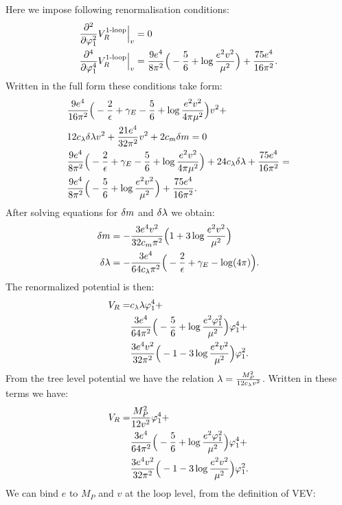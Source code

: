 Here we impose following renormalisation conditions:
\begin{align}
\frac{\partial^2 }{\partial \varphi_1^2}V_R^{\textrm{1-loop}}\Big|_{v} &= 0 \\
\frac{\partial^4 }{\partial \varphi_1^4}V_R^{\textrm{1-loop}}\Big|_{v} &= \frac{9e^4}{8\pi^2}\Big(-\frac{5}{6}+\log\frac{e^2
v^2}{\mu^2}\Big)
+\frac{75e^4}{16\pi^2}.
\end{align}
Written in the full form these conditions take form:
\begin{align}
&\frac{9e^4}{16\pi^2}\Big(-\frac{2}{\epsilon}+\gamma_E-\frac{5}{6}+\log\frac{e^2
v^2}{4\pi\mu^2}\Big)v^2+ \notag\\
& 12c_\lambda\delta\lambda v^2+\frac{21e^4}{32\pi^2}v^2+2c_m\delta m = 0 \\
&\frac{9e^4}{8\pi^2}\Big(-\frac{2}{\epsilon}+\gamma_E-\frac{5}{6}+\log\frac{e^2v^2}{4\pi\mu^2}\Big)+
24c_\lambda\delta\lambda+\frac{75e^4}{16\pi^2} = \notag \\
&\frac{9e^4}{8\pi^2}\Big(-\frac{5}{6}+\log\frac{e^2v^2}{\mu^2}\Big)+\frac{75e^4}{16\pi^2}.
\end{align}
After solving equations for $\delta m$ and $\delta\lambda$ we obtain:
\begin{align}
\delta m &= -\frac{3e^4v^2}{32c_m\pi^2}\Big(1+3
\log\frac{e^2v^2}{\mu^2}\Big) \\
\delta\lambda &= -\frac{3e^4}{64c_\lambda\pi^2}\Big(-\frac{2}{\epsilon}+\gamma_E-\log(4\pi)\Big).
\end{align}
The renormalized potential is then:
\begin{align}
V_R = &c_\lambda\lambda\varphi_1^4 + \notag \\ 
&\frac{3e^4}{64\pi^2}\Big(-\frac{5}{6}+\log\frac{e^2\varphi_1^2}{\mu^2}\Big)\varphi_1^4+ \notag\\
&\frac{3e^4v^2}{32\pi^2}\Big(-1-3\log\frac{e^2v^2}{\mu^2}\Big)\varphi_1^2.
\end{align}
From the tree level potential we have the relation $\lambda = \frac{M_P^2}{12c_\lambda v^2}$. 
Written in these terms we have:
\begin{align}
V_R = &\frac{M_P^2}{12v^2}\varphi_1^4 + \notag \\ 
&\frac{3e^4}{64\pi^2}\Big(-\frac{5}{6}+\log\frac{e^2\varphi_1^2}{\mu^2}\Big)\varphi_1^4+ \notag\\
&\frac{3e^4v^2}{32\pi^2}\Big(-1-3\log\frac{e^2v^2}{\mu^2}\Big)\varphi_1^2.
\end{align}
We can bind $e$ to $M_P$ and $v$ at the loop level, from the definition of VEV:
